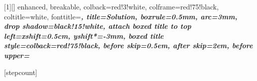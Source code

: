 [1][]{
    enhanced, breakable,
    colback=red!3!white,        %
    colframe=red!75!black,      %
    coltitle=white,
    fonttitle=\bfseries\Large\itshape,
    title={Solution}, %
    boxrule=0.5mm,
    arc=3mm,
    drop shadow=black!15!white,
    attach boxed title to top left={xshift=0.5cm, yshift*=-3mm},
    boxed title style={colback=red!75!black},
    before skip=0.5em,          %
    after skip=2em,             %
    before upper={\setcounter{stepcount}{0}} %
}

\newcommand{\makeCustomTitle}[1]{
    \begin{center}
        \vspace*{1cm}
        {\Huge \bfseries \color{primaryColor} 作业 #1}\\
        \vspace{0.5cm}
        {\Large \color{accentColor} \today}
        \vspace{1.2cm}
    \end{center}
}


[stepcount]

\pretocmd{\section}{\setcounter{problemSeq}{0}}{}{}

\newenvironment{proofstep}[1]
  {%
    \refstepcounter{stepcount}%
    \par\vspace{1.5em}%
    \noindent\textbf{\large \thestepcount. #1}%
    \par\vspace{0.5em}%
  }
  {\par}

